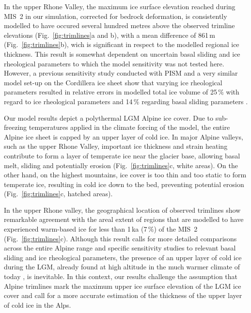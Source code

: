 \documentclass[tc, manuscript]{copernicus}
\begin{document}
    In the upper Rhone Valley, the maximum ice surface elevation reached
    during MIS~2 in our simulation, corrected for bedrock deformation, is
    consistently modelled to have occured several hundred metres above the
    observed trimline elevations (Fig.~\ref{fig:trimlines}a and b), with a mean
    difference of 861\,m (Fig.~\ref{fig:trimlines}b), wich is significant in
    respect to the modelled regional ice thickness. This result is
    somewhat dependent on uncertain basal sliding and ice rheological parameters
    to which the model sensitivity was not tested here. However, a previous
    sensitivity study conducted with PISM and a very similar model set-up on
    the Cordillera ice sheet show that varying ice rheological parameters
    resulted in relative errors in modelled total ice volume of 25\,\unit{\%}
    with regard to ice rheological parameters and 14\,\unit{\%} regarding basal
    sliding parameters \citep[Fig.~7]{Seguinot.etal.2016}.

    Our model results depict a polythermal LGM Alpine ice cover.
    Due to sub-freezing temperatures applied in the climate forcing of the
    model, the entire Alpine ice sheet is capped by an upper layer of cold ice.
    In major Alpine valleys, such as the upper Rhone Valley, important ice
    thickness and strain heating contribute to form a layer of temperate ice
    near the glacier base, allowing basal melt, sliding and potentially
    erosion (Fig.~\ref{fig:trimlines}c, white areas). On the other hand, on the
    highest mountains, ice cover is too thin and too static to form temperate
    ice, resulting in cold ice down to the bed, preventing potential erosion
    (Fig.~\ref{fig:trimlines}c, hatched areas).

    In the upper Rhone valley, the geographical location of observed trimlines
    show remarkable agreement with the areal extent of regions that are
    modelled to have experienced warm-based ice for less than 1\,ka (7\,\%) of the
    MIS~2 (Fig.~\ref{fig:trimlines}c). Although this result calls for more
    detailed comparisons across the
    entire Alpine range and specific sensitivity studies to relevant basal
    sliding and ice rheological parameters, the presence of an upper layer of
    cold ice during the LGM, already found at high altitude in the much warmer
    climate of today \citep[e.g.,][]{Suter.etal.2001, Bohleber.etal.2017}, is
    inevitable. In this context, our results challenge the assumption that
    Alpine trimlines mark the maximum upper ice surface elevation of the LGM
    ice cover and call for a more accurate estimation of the thickness of the
    upper layer of cold ice in the Alps.
\end{document}
